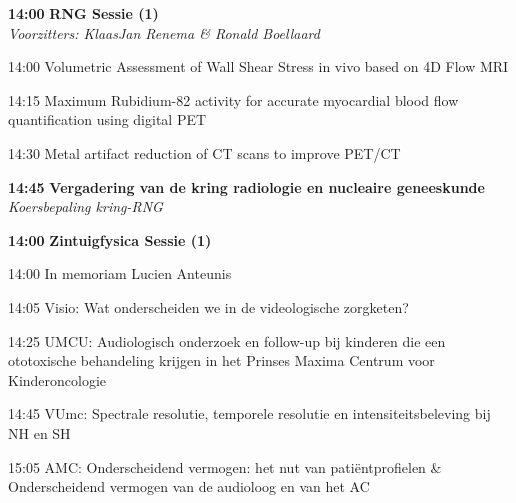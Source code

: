 \documentclass[a4paper,10pt]{report}
\begin{document}
\begin{multicols*}{3}
\begin{packed_enum}
\item[\textbf{14:00}]\textbf{RNG Sessie (1)}\\\textit{Voorzitters: KlaasJan Renema \& Ronald Boellaard}
\item[14:00] Volumetric Assessment of Wall Shear Stress in vivo based on 4D Flow MRI 
\item[14:15] Maximum Rubidium-82 activity for accurate myocardial blood flow quantification using digital PET 
\item[14:30] Metal artifact reduction of CT scans to improve PET/CT 
\item[\textbf{14:45}] \textbf{Vergadering van de kring radiologie en nucleaire geneeskunde}\\ \textit{Koersbepaling kring-RNG}
\end{packed_enum} %
 
\vfill

\begin{packed_enum}
\item[\textbf{14:00}] \textbf{Zintuigfysica Sessie (1)}
\item[14:00] In memoriam Lucien Anteunis 
\item[14:05] Visio: Wat onderscheiden we in de videologische zorg\-keten? 
\item[14:25] UMCU: Audiologisch onderzoek en follow-up bij kinderen die een ototoxische behandeling krijgen in het Prinses Maxima Centrum voor Kinderoncologie  
\item[14:45] VUmc: Spectrale resolutie, temporele resolutie en intensiteitsbeleving bij NH en SH 
\item[15:05] AMC: Onderscheidend vermogen: het nut van patiëntprofielen \&
Onderscheidend vermogen van de audioloog en van het AC
\end{packed_enum} %


\end{multicols*}
\end{document}
